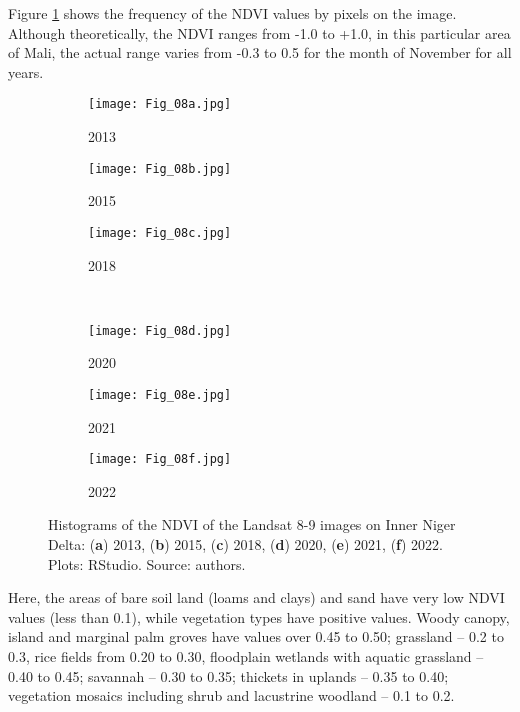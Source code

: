 \documentclass[12pt,a4paper,oneside]{article}
\begin{document}
Figure \ref{fig08} shows the frequency of the NDVI values by pixels on the image. Although theoretically, the NDVI ranges from -1.0 to +1.0, in this particular area of Mali, the actual range varies from -0.3 to 0.5 for the month of November for all years.

\begin{figure}[H]
	\begin{subfigure}[b]{.35\textwidth}
		\centering
		\texttt{[image: Fig\_08a.jpg]}
		\caption{2013}
	\end{subfigure}%
	\begin{subfigure}[b]{.35\textwidth}
		\centering
		\texttt{[image: Fig\_08b.jpg]}
		\caption{2015}
	\end{subfigure}%
	\begin{subfigure}[b]{.35\textwidth}
		\centering
		\texttt{[image: Fig\_08c.jpg]}
		\caption{2018}
	\end{subfigure}%
\\
\vfill \vspace{1mm}
	\begin{subfigure}[b]{.35\textwidth}
		\centering
			\texttt{[image: Fig\_08d.jpg]}
		\caption{2020}
	\end{subfigure}%
	\begin{subfigure}[b]{.35\textwidth}
		\centering
		\texttt{[image: Fig\_08e.jpg]}
		\caption{2021}
	\end{subfigure}%
	\begin{subfigure}[b]{.35\textwidth}
		\centering
		\texttt{[image: Fig\_08f.jpg]}
		\caption{2022}
	\end{subfigure}%
\vspace*{20pt}\caption{Histograms of the NDVI of the Landsat 8-9 images on Inner Niger Delta: (\textbf{a}) 2013, (\textbf{b}) 2015, (\textbf{c}) 2018, (\textbf{d}) 2020, (\textbf{e}) 2021, (\textbf{f}) 2022. Plots: RStudio. Source: authors.}\label{fig08}
\end{figure}

Here, the areas of bare soil land (loams and clays) and sand have very low NDVI values (less than 0.1), while vegetation types have positive values. Woody canopy, island and marginal palm groves have values over 0.45 to 0.50; grassland -- 0.2 to 0.3, rice fields from 0.20 to 0.30, floodplain wetlands with aquatic grassland -- 0.40 to 0.45; savannah -- 0.30 to 0.35; thickets in uplands -- 0.35 to 0.40; vegetation mosaics including shrub and lacustrine woodland -- 0.1 to 0.2.
\end{document}
